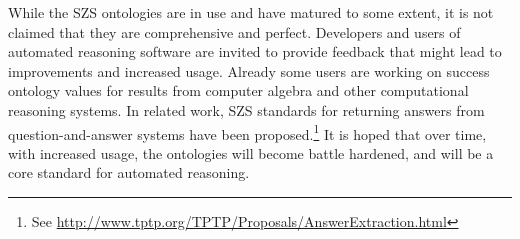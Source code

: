 \documentclass[a4paper]{easychair}
\begin{document}
While the SZS ontologies are in use and have matured to some extent, it
is not claimed that they are comprehensive and perfect.
Developers and users of automated reasoning software are invited to provide
feedback that might lead to improvements and increased usage.
Already some users are working on success ontology values for results from
computer algebra and other computational reasoning systems.
In related work, SZS standards for returning answers from question-and-answer
systems have been proposed.\footnote{%
See \url{http://www.tptp.org/TPTP/Proposals/AnswerExtraction.html}}
It is hoped that over time, with increased usage, the ontologies will
become battle hardened, and will be a core standard for automated reasoning.



\end{document}
